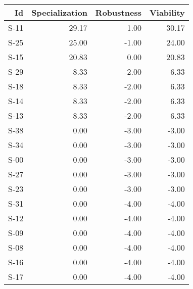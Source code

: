 \begin{tabular}{ | r | r | r | r | }
    \hline
                    Id  &  Specialization  &      Robustness  &       Viability  \\
    \hline
    \hline
                  S-11  &           29.17  &            1.00  &           30.17  \\
    \hline
                  S-25  &           25.00  &           -1.00  &           24.00  \\
    \hline
                  S-15  &           20.83  &            0.00  &           20.83  \\
    \hline
                  S-29  &            8.33  &           -2.00  &            6.33  \\
    \hline
                  S-18  &            8.33  &           -2.00  &            6.33  \\
    \hline
                  S-14  &            8.33  &           -2.00  &            6.33  \\
    \hline
                  S-13  &            8.33  &           -2.00  &            6.33  \\
    \hline
                  S-38  &            0.00  &           -3.00  &           -3.00  \\
    \hline
                  S-34  &            0.00  &           -3.00  &           -3.00  \\
    \hline
                  S-00  &            0.00  &           -3.00  &           -3.00  \\
    \hline
                  S-27  &            0.00  &           -3.00  &           -3.00  \\
    \hline
                  S-23  &            0.00  &           -3.00  &           -3.00  \\
    \hline
                  S-31  &            0.00  &           -4.00  &           -4.00  \\
    \hline
                  S-12  &            0.00  &           -4.00  &           -4.00  \\
    \hline
                  S-09  &            0.00  &           -4.00  &           -4.00  \\
    \hline
                  S-08  &            0.00  &           -4.00  &           -4.00  \\
    \hline
                  S-16  &            0.00  &           -4.00  &           -4.00  \\
    \hline
                  S-17  &            0.00  &           -4.00  &           -4.00  \\

\end{tabular}

